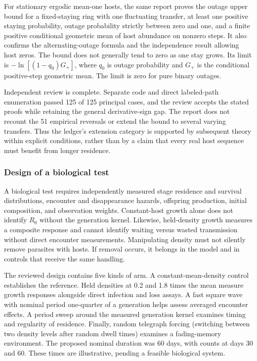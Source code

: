 For stationary ergodic mean-one hosts, the same report proves the outage
upper bound for a fixed-staying ring
with one fluctuating transfer, at least one positive staying probability,
outage probability strictly between zero and one, and a finite positive
conditional geometric mean of host abundance on nonzero steps. It also
confirms the alternating-outage formula and the independence result allowing
host zeros. The bound does not generally tend to zero as one stay grows.
Its limit is $-\ln[(1-q_0)G_+]$, where $q_0$ is outage probability and
$G_+$ is the conditional positive-step geometric mean. The limit is zero
for pure binary outages.

Independent review is complete. Separate code and direct labeled-path
enumeration passed 125 of 125 principal cases, and the review accepts the
stated proofs while retaining the general derivative-sign gap. The report
does not recount the 51 empirical reversals or extend the bound to several
varying transfers. Thus the ledger's extension category is supported by
subsequent theory within explicit conditions, rather than by a claim that
every real host sequence must benefit from longer residence.

\subsubsection{Design of a biological test}
\label{num-esm-experiment}

A biological test requires independently measured stage residence and
survival distributions, encounter and disappearance hazards, offspring
production, initial composition, and observation weights. Constant-host
growth alone does not identify $R_0$ without the generation kernel.
Likewise, held-density growth measures a composite response and cannot
identify waiting versus wasted transmission without direct encounter
measurements. Manipulating density must not silently remove parasites
with hosts. If removal occurs, it belongs in the model and in controls
that receive the same handling.

The reviewed design contains five kinds of arm. A constant-mean-density
control establishes the reference. Held densities at 0.2 and 1.8 times
the mean measure growth responses alongside direct infection and loss
assays. A fast square wave with nominal period one-quarter of a generation
helps assess averaged encounter effects. A period sweep around the
measured generation kernel examines timing and regularity of residence.
Finally, random telegraph forcing (switching between two density levels
after random dwell times) examines a fading-memory environment. The
proposed nominal duration was 60 days, with counts at days 30 and 60.
These times are illustrative, pending a feasible biological system.

